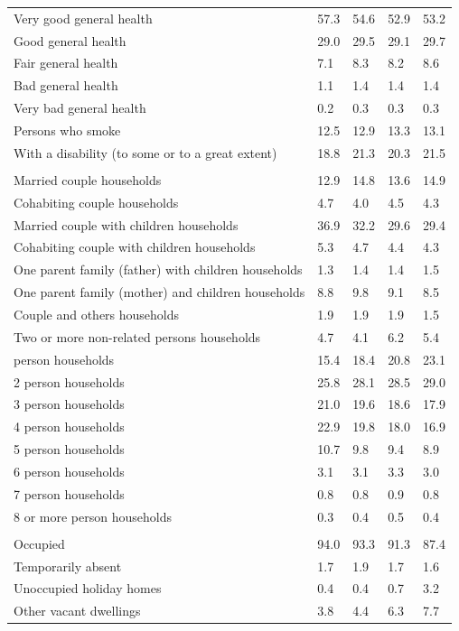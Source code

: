 \documentclass{article}
\begin{document}
\begin{table}[h]
\begin{tabular}{KTTTT}
    \hline
Very good general health & 57.3& 54.6&52.9& 53.2\\
Good general health & 29.0& 29.5& 29.1& 29.7\\
Fair general health & 7.1& 8.3&8.2& 8.6\\
Bad general health & 1.1& 1.4&1.4& 1.4\\
Very bad general health & 0.2& 0.3&0.3& 0.3\\
    \hline
Persons who smoke & 12.5& 12.9&13.3& 13.1\\
    \hline
With a disability (to some or to a great extent) & 18.8& 21.3&20.3& 21.5\\
\hline
    \\ 
    \hline
Married couple households & 12.9& 14.8& 13.6& 14.9\\
Cohabiting couple households & 4.7& 4.0& 4.5& 4.3\\
Married couple with children households & 36.9& 32.2& 29.6& 29.4\\
Cohabiting couple with children households & 5.3& 4.7& 4.4& 4.3\\
One parent family (father) with  children households & 1.3& 1.4& 1.4& 1.5\\
One parent family (mother) and children households & 8.8& 9.8& 9.1& 8.5\\
Couple and others households  & 1.9& 1.9& 1.9& 1.5\\
Two or more non-related persons households & 4.7& 4.1& 6.2& 5.4\\
     person households & 15.4& 18.4& 20.8& 23.1\\
2 person households & 25.8& 28.1& 28.5& 29.0\\
3 person households & 21.0& 19.6& 18.6& 17.9\\
4 person households & 22.9& 19.8& 18.0& 16.9\\
5 person households & 10.7&  9.8&  9.4&  8.9\\
6 person households & 3.1& 3.1& 3.3& 3.0\\
7 person households & 0.8& 0.8& 0.9& 0.8\\
8 or more person households & 0.3& 0.4& 0.5& 0.4\\
\hline
    \\ 
    \hline
Occupied & 94.0& 93.3& 91.3& 87.4\\
Temporarily absent & 1.7& 1.9& 1.7& 1.6\\
Unoccupied holiday homes & 0.4& 0.4& 0.7& 3.2\\
Other vacant dwellings & 3.8& 4.4& 6.3& 7.7\\
\hline
\end{tabular}
\end{table}
\end{document}
